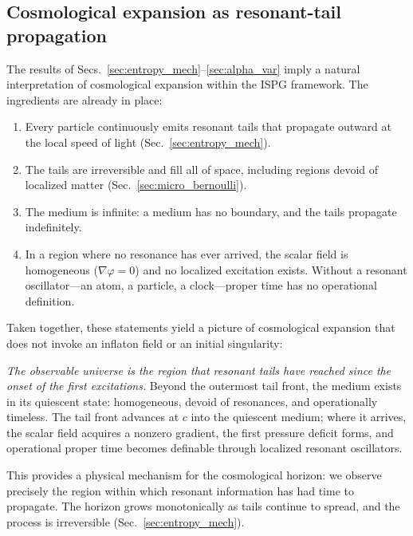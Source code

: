 \documentclass[aps,prd,onecolumn,superscriptaddress,nofootinbib,showpacs,12pt,notitlepage]{revtex4-2}
\begin{document}
\subsection{Cosmological expansion as resonant-tail propagation}
\label{sec:tail_expansion}

The results of
Secs.~\ref{sec:entropy_mech}--\ref{sec:alpha_var} imply a
natural interpretation of cosmological expansion within the
ISPG framework.  The ingredients are already in place:
\begin{enumerate}
  \item Every particle continuously emits resonant tails
    that propagate outward at the local speed of light
    (Sec.~\ref{sec:entropy_mech}).
  \item The tails are irreversible and fill all of space,
    including regions devoid of localized matter
    (Sec.~\ref{sec:micro_bernoulli}).
  \item The medium is infinite: a medium has no boundary,
    and the tails propagate indefinitely.
  \item In a region where no resonance has ever arrived,
    the scalar field is homogeneous
    ($\nabla\varphi = 0$) and no localized excitation
    exists.  Without a resonant oscillator---an
    atom, a particle, a clock---proper time has no
    operational definition.
\end{enumerate}

Taken together, these statements yield a picture of
cosmological expansion that does not invoke an inflaton
field or an initial singularity:

\textit{The observable universe is the region that resonant
tails have reached since the onset of the first excitations.}
Beyond the outermost tail front, the medium exists in its
quiescent state: homogeneous, devoid of resonances, and
operationally timeless.  The tail front advances at $c$
into the quiescent medium; where it arrives, the scalar
field acquires a nonzero gradient, the first pressure
deficit forms, and operational proper time becomes
definable through localized resonant oscillators.

This provides a physical mechanism for the cosmological
horizon: we observe precisely the region within which
resonant information has had time to propagate.  The
horizon grows monotonically as tails continue to spread,
and the process is irreversible (Sec.~\ref{sec:entropy_mech}).
\end{document}
